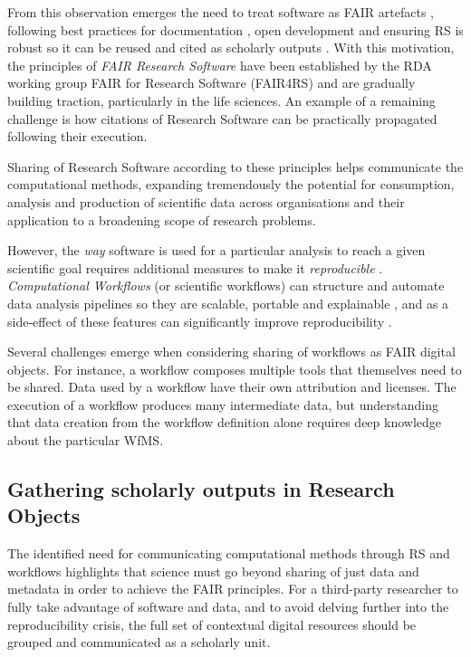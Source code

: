 From this observation emerges the need to treat software as FAIR artefacts \cite{Lamprecht 2019}, following best practices for documentation \cite{Lee 2018}, open development \cite{Prlić 2012} and ensuring \acrfull{RS} is robust \cite{Taschuk 2017} so it can be reused and cited as scholarly outputs \cite{Smith 2016}. 
With this motivation, the principles of \emph{FAIR Research Software} \cite{Katz 2021b} have been established by the \acrfull{RDA} working group FAIR for Research Software (FAIR4RS)  \cite{Barker 2022} and are gradually building traction, particularly in the life sciences.
An example of a remaining challenge is how citations of Research Software can be practically propagated following their execution. 

Sharing of Research Software according to these principles helps communicate the computational methods, expanding tremendously the potential for consumption, analysis and production of scientific data across organisations and their application to a broadening scope of research problems.

However, the \emph{way} software is used for a particular analysis to reach a given scientific goal requires additional measures to make it \emph{reproducible} \cite{Stodden 2016,Sandve 2013}. \emph{Computational Workflows} (or \glspl{scientific workflow}) can structure and automate data analysis pipelines so they are scalable, portable and explainable \cite{Atkinson 2017}, and as a side-effect of these features can significantly improve reproducibility \cite{Cohen-Boulakia 2017}. 

Several challenges emerge when considering sharing of workflows as FAIR digital objects. For instance, a workflow composes multiple tools that themselves need to be shared. Data used by a workflow have their own attribution and licenses. The execution of a workflow produces many intermediate data, but understanding that data creation from the workflow definition alone requires deep knowledge about the particular \acrfull{WfMS}.



\subsection{Gathering scholarly outputs in Research Objects}

The identified need for communicating computational methods through \acrlong{RS} and workflows highlights that science must go beyond sharing of just data and metadata in order to achieve the FAIR principles. For a third-party researcher to fully take advantage of software and data, and to avoid delving further into the reproducibility crisis, the full set of contextual digital resources should be grouped and communicated as a scholarly unit.

